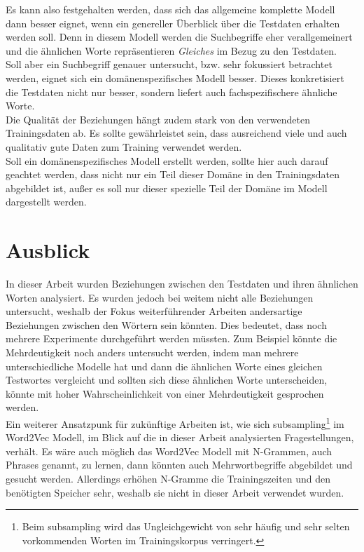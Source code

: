 \documentclass[12pt,a4paper]{report}
\begin{document}
Es kann also festgehalten werden, dass sich das allgemeine komplette Modell dann besser eignet, wenn ein genereller Überblick über die Testdaten erhalten werden soll. Denn in diesem Modell werden die Suchbegriffe eher verallgemeinert und die ähnlichen Worte repräsentieren \textit{Gleiches} im Bezug zu den Testdaten.\\
Soll aber ein Suchbegriff genauer untersucht, bzw. sehr fokussiert betrachtet werden, eignet sich ein domänenspezifisches Modell besser. Dieses konkretisiert die Testdaten nicht nur besser, sondern liefert auch fachspezifischere ähnliche Worte.\\

Die Qualität der Beziehungen hängt zudem stark von den verwendeten Trainingsdaten ab. Es sollte gewährleistet sein, dass ausreichend viele und auch qualitativ gute Daten zum Training verwendet werden.\\
Soll ein domänenspezifisches Modell erstellt werden, sollte hier auch darauf geachtet werden, dass nicht nur ein Teil dieser Domäne in den Trainingsdaten abgebildet ist, außer es soll nur dieser spezielle Teil der Domäne im Modell dargestellt werden.\\


\section{Ausblick}

In dieser Arbeit wurden Beziehungen zwischen den Testdaten und ihren ähnlichen Worten analysiert. Es wurden jedoch bei weitem nicht alle Beziehungen untersucht, weshalb der Fokus weiterführender Arbeiten andersartige Beziehungen zwischen den Wörtern sein könnten. Dies bedeutet, dass noch mehrere Experimente durchgeführt werden müssten. Zum Beispiel könnte die Mehrdeutigkeit noch anders untersucht werden, indem man mehrere unterschiedliche Modelle hat und dann die ähnlichen Worte eines gleichen Testwortes vergleicht und sollten sich diese ähnlichen Worte unterscheiden, könnte mit hoher Wahrscheinlichkeit von einer Mehrdeutigkeit gesprochen werden.\\
Ein weiterer Ansatzpunk  für zukünftige Arbeiten ist, wie sich subsampling\footnote{Beim subsampling wird das Ungleichgewicht von sehr häufig und sehr selten vorkommenden Worten im Trainingskorpus verringert\citep{DBLP:journals/corr/MikolovSCCD13}. } im Word2Vec Modell, im Blick auf die in dieser Arbeit analysierten Fragestellungen, verhält. Es wäre auch möglich das Word2Vec Modell mit N-Grammen, auch Phrases genannt, zu lernen, dann könnten auch Mehrwortbegriffe abgebildet und gesucht werden. Allerdings erhöhen N-Gramme die Trainingszeiten und den benötigten Speicher sehr\citep{DBLP:journals/corr/MikolovSCCD13}, weshalb sie nicht in dieser Arbeit verwendet wurden.
\end{document}
